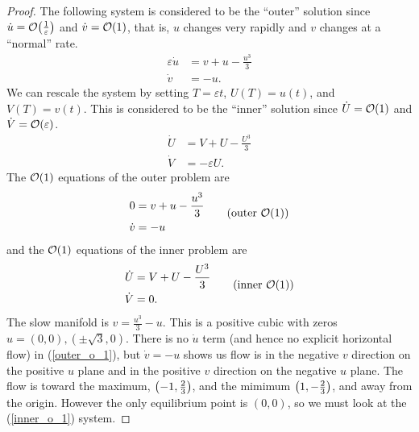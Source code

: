 \documentclass{article} %
\theoremstyle{plain}
\newcommand{\E}{\varepsilon}
\numberwithin{equation}{section} %
\numberwithin{figure}{section} %
\numberwithin{table}{section} %
\begin{document}
\begin{proof}
    The following system is considered to be the ``outer'' solution since $\dot{u} = \order{\frac{1}{\E}}$ and $\dot{v} = \order{1}$, that is, $u$ changes very rapidly and $v$ changes at a ``normal'' rate.
    \begin{equation}
        \begin{aligned}
            \E \dot{u} &= v + u - \frac{u^3}{3} \\
            \dot{v} &= -u.
        \end{aligned}
        \tag{outer}
    \end{equation}
    We can rescale the system by setting $T = \E t$, $U(T) = u(t)$, and $V(T) = v(t)$.  This is considered to be the ``inner'' solution since $\dot{U} = \order{1}$ and $\dot{V} = \order{\E}$.
    \begin{equation}
        \begin{aligned}
            \dot{U} &= V + U - \frac{U^3}{3} \\
            \dot{V} &= -\E U.
        \end{aligned}
        \tag{inner}
    \end{equation}
    The $\order{1}$ equations of the outer problem are
    \begin{equation}
        \begin{aligned}
            0 &= v + u - \frac{u^3}{3} \\
            \dot{v} &= -u
        \end{aligned}
        \tag{outer $\order{1}$}
        \label{outer_o_1}
    \end{equation}
    and the $\order{1}$ equations of the inner problem are
    \begin{equation}
        \begin{aligned}
            \dot{U} &= V + U - \frac{U^3}{3} \\
            \dot{V} &= 0.
        \end{aligned}
        \tag{inner $\order{1}$}
        \label{inner_o_1}
    \end{equation}
    The slow manifold is $v = \frac{u^3}{3} - u$.  This is a positive cubic with zeros $u = (0,0), (\pm\sqrt{3}, 0)$.  There is no $\dot{u}$ term (and hence no explicit horizontal flow) in (\ref{outer_o_1}), but $\dot{v} = -u$ shows us flow is in the negative $v$ direction on the positive $u$ plane and in the positive $v$ direction on the negative $u$ plane.  The flow is toward the maximum, $\qty(-1, \frac{2}{3})$, and the mimimum $\qty(1, -\frac{2}{3})$, and away from the origin.  However the only equilibrium point is $(0,0)$, so we must look at the (\ref{inner_o_1}) system.


\end{proof}
\end{document}

